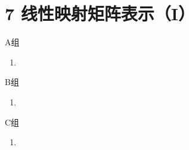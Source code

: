 \section*{7 线性映射矩阵表示（I）}

\vspace{2ex}

\centerline{\heiti A组}
\begin{enumerate}
    \item
\end{enumerate}

\centerline{\heiti B组}
\begin{enumerate}
    \item
\end{enumerate}

\centerline{\heiti C组}
\begin{enumerate}
    \item
\end{enumerate}

\clearpage
